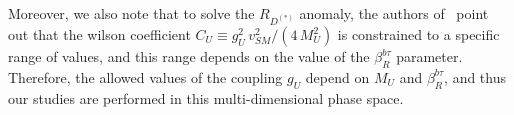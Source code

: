 Moreover, we also note that to solve the $R_{D^{(*)}}$ anomaly, the authors of~\parencite{Cornella:2021sby} point out that the wilson coefficient $C_U\equiv g^2_U\,v^2_{SM}/(4\,M^2_U)$ is constrained to a specific range of values, and this range depends on the value of the $\beta_R^{b\tau}$ parameter. Therefore, the allowed values of the coupling $g_{U}$ depend on $M_{U}$ and $\beta_R^{b\tau}$, and thus our studies are performed in this multi-dimensional phase space.

 



